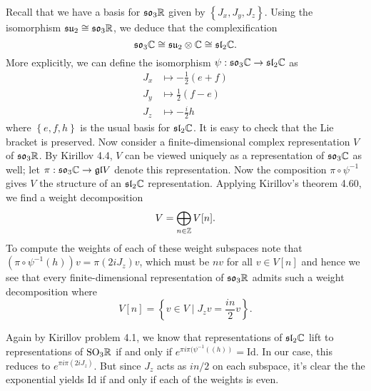 \documentclass{../../mathnotes}
\begin{document}

Recall that we have a basis for $\mathfrak{so}_3\mathbb{R}$ given by $\left\{ J_x,J_y,J_z \right\}$. Using the isomorphism $\mathfrak{su}_2\cong\mathfrak{so}_3\mathbb{R}$, we
deduce that the complexification
\[\mathfrak{so}_3\mathbb{C}\cong \mathfrak{su}_2\otimes\mathbb{C}\cong \mathfrak{sl}_2\mathbb{C}.\]
More explicitly, we can define the isomorphism $\psi:\mathfrak{so}_3\mathbb{C}\to\mathfrak{sl}_2\mathbb{C}$ as 
\begin{align*}
    J_x &\mapsto -\frac{1}{2}(e+f)\\
    J_y &\mapsto \frac{1}{2}(f-e)\\
    J_z &\mapsto -\frac{i}{2}h
\end{align*}
where $\left\{ e,f,h \right\}$ is the usual basis for $\mathfrak{sl}_2\mathbb{C}$. It is easy to check that the Lie bracket is preserved.
Now consider a finite-dimensional complex representation $V$ of $\mathfrak{so}_3\mathbb{R}$. By Kirillov 4.4, $V$ can be viewed uniquely as a representation
of $\mathfrak{so}_3\mathbb{C}$ as well; let $\pi:\mathfrak{so}_3\mathbb{C}\to\mathfrak{gl}V$ denote this representation. Now the composition $\pi\circ\psi^{-1}$ gives $V$ the structure of an 
$\mathfrak{sl}_2\mathbb{C}$ representation. Applying Kirillov's theorem 4.60, we find a weight decomposition
\[V=\bigoplus_{n\in\mathbb{Z}} V[n].\]
To compute the weights of each of these weight subspaces note that $(\pi\circ \psi^{-1}(h))v=\pi(2iJ_z)v$, which must be $nv$ for all $v\in V[n]$
and hence we see that every finite-dimensional representation of $\mathfrak{so}_3\mathbb{R}$ admits such a weight decomposition where
\[V[n]=\left\{ v\in V\mid J_zv=\frac{in}{2}v \right\}.\]

Again by Kirillov problem 4.1, we know that representations of $\mathfrak{sl}_2\mathbb{C}$ lift to representations of $\text{SO}_3\mathbb{R}$ if and only if
$e^{\pi i\pi(\psi^{-1}((h))}=\text{Id}$. In our case, this reduces to $e^{\pi i \pi(2iJ_z)}$. But since $J_z$ acts as $in/2$ on each subspace,
it's clear the the exponential yields $\text{Id}$ if and only if each of the weights is even.
\end{document}
